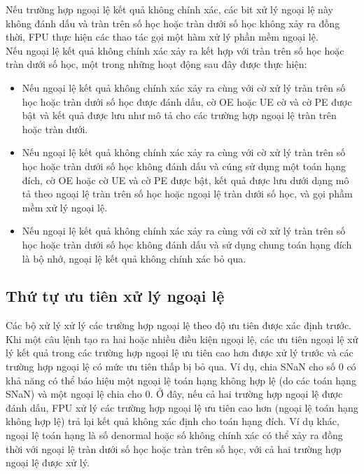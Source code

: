 		Nếu trường hợp ngoại lệ kết quả không chính xác, các bit xử lý ngoại lệ này không đánh dấu và tràn trên số học hoặc tràn dưới số học không xảy ra đồng thời, FPU thực hiện các thao tác gọi một hàm xử lý phần mềm ngoại lệ.\\
		
		Nếu ngoại lệ kết quả không chính xác xảy ra kết hợp với tràn trên số học hoặc tràn dưới số học, một trong những hoạt động sau đây được thực hiện:
		\begin{itemize}
			\renewcommand{\labelitemi}{\textbullet}
			\item	Nếu ngoại lệ kết quả không chính xác xảy ra cùng với cờ xử lý tràn trên số học hoặc tràn dưới số học được đánh dấu, cờ OE hoặc UE cờ và cờ PE được bật và kết quả được lưu như mô tả cho các trường hợp ngoại lệ tràn trên hoặc tràn dưới.
			\item  	Nếu ngoại lệ kết quả không chính xác xảy ra cùng với cờ xử lý tràn trên số học hoặc tràn dưới số học không đánh dấu và cúng sử dụng một toán hạng đích, cờ OE hoặc cờ UE và cờ PE được bật, kết quả được lưu dưới dạng mô tả theo ngoại lệ tràn trên số học hoặc ngoại lệ tràn dưới số học, và gọi phầm mềm xử lý ngoại lệ.
			\item  	Nếu ngoại lệ kết quả không chính xác xảy ra cùng với cờ xử lý tràn trên số học hoặc tràn dưới số học không đánh dấu và sử dụng chung toán hạng đích là bộ nhớ, ngoại lệ kết quả không chính xác bỏ qua.
		\end{itemize}
	
			\subsection*{Thứ tự ưu tiên xử lý ngoại lệ}
		Các bộ xử lý xử lý các trường hợp ngoại lệ theo độ ưu tiên được xác định trước. Khi một câu lệnh tạo ra hai hoặc nhiều điều kiện ngoại lệ, các ưu tiên ngoại lệ xử lý kết quả trong các trường hợp ngoại lệ ưu tiên cao hơn được xử lý trước và các trường hợp ngoại lệ có mức ưu tiên thấp bị bỏ qua. Ví dụ, chia SNaN cho số 0 có khả năng có thể báo hiệu một ngoại lệ toán hạng không hợp lệ  (do các toán hạng SNaN) và một ngoại lệ chia cho 0. Ở đây, nếu cả hai trường hợp ngoại lệ được đánh dấu, FPU xử lý các trường hợp ngoại lệ ưu tiên cao hơn (ngoại lệ toán hạng không hợp lệ) trả lại kết quả không xác định cho toán hạng đích. Ví dụ khác, ngoại lệ toán hạng là số denormal hoặc số không chính xác có thể xảy ra đồng thời với ngoại lệ tràn dưới số học hoặc tràn trên số học, với cả hai trường hợp ngoại lệ được xử lý.\\
		
